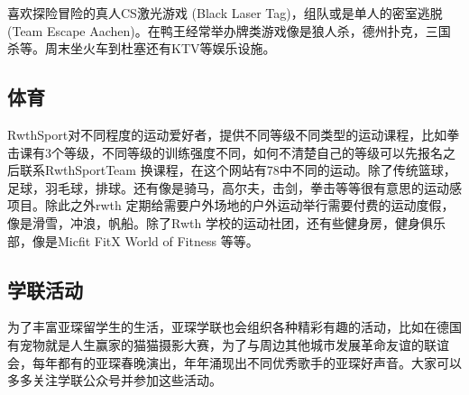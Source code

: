     喜欢探险冒险的真人CS激光游戏 (Black Laser Tag)，组队或是单人的密室逃脱 (Team Escape Aachen)。在鸭王经常举办牌类游戏像是狼人杀，德州扑克，三国杀等。周末坐火车到杜塞还有KTV等娱乐设施。

  \subsection{体育}\label{subsec:体育}

    RwthSport对不同程度的运动爱好者，提供不同等级不同类型的运动课程，比如拳击课有3个等级，不同等级的训练强度不同，如何不清楚自己的等级可以先报名之后联系RwthSportTeam 换课程，在这个网站有78中不同的运动。除了传统篮球，足球，羽毛球，排球。还有像是骑马，高尔夫，击剑，拳击等等很有意思的运动感项目。除此之外rwth 定期给需要户外场地的户外运动举行需要付费的运动度假，像是滑雪，冲浪，帆船。除了Rwth 学校的运动社团，还有些健身房，健身俱乐部，像是Micfit FitX World of Fitness 等等。

  \subsection{学联活动}\label{subsec:学联活动}

    为了丰富亚琛留学生的生活，亚琛学联也会组织各种精彩有趣的活动，比如在德国有宠物就是人生赢家的猫猫摄影大赛，为了与周边其他城市发展革命友谊的联谊会，每年都有的亚琛春晚演出，年年涌现出不同优秀歌手的亚琛好声音。大家可以多多关注学联公众号并参加这些活动。
